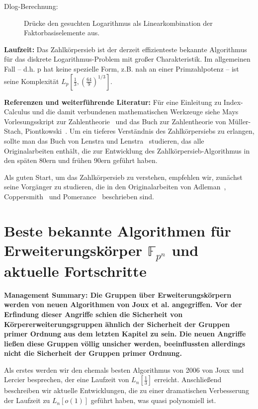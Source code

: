 \begin{refsegment}
\begin{description}
\item[Dlog-Berechnung:] Drücke den gesuchten Logarithmus als Linearkombination der Faktorbasiselemente aus.
\end{description}

\textbf{Laufzeit:}
Das Zahlkörpersieb ist der derzeit effizienteste bekannte Algorithmus für das diskrete Logarithmus-Problem mit großer Charakteristik. Im allgemeinen Fall -- d.h. p hat keine spezielle Form, z.B. nah an einer Primzahlpotenz -- ist seine Komplexität $L_p[\frac 1
3,\left(\frac{64}{9}\right)^{1/3}]$.

\textbf{Referenzen und weiterführende Literatur:}
Für eine Einleitung zu Index-Calculus und die damit verbundenen mathematischen Werkzeuge siehe Mays Vorlesungsskript zur Zahlentheorie~\cite{May2013} und das Buch zur Zahlentheorie von M\"uller-Stach, Piontkowski~\cite{MSP2011}. Um ein tieferes Verständnis des Zahlkörpersiebs zu erlangen, sollte man das Buch von Lenstra und Lenstra~\cite{NFS1993} studieren, das alle Originalarbeiten enthält, die zur Entwicklung des Zahlkörpersieb-Algorithmus in den späten 80ern und frühen 90ern geführt haben.

Als guten Start, um das Zahlkörpersieb zu verstehen, empfehlen wir, zunächst seine Vorgänger zu studieren, die in den Originalarbeiten von Adleman~\cite{Adleman1979}, Coppersmith~\cite{CoppersmithOS1986} und Pomerance~\cite{Pomerance1984,Pomerance1996} beschrieben sind.


\section{\texorpdfstring{Beste bekannte Algorithmen für Erweiterungskörper $\mathbb{F}_{p^n}$ und aktuelle Fortschritte}
                        {Beste bekannte Algorithmen für Erweiterungskörper Fpn und aktuelle Fortschritte}}
\label{ffs}
\textbf{Management Summary: Die Gruppen über Erweiterungskörpern werden von neuen Algorithmen von Joux et al. angegriffen. Vor der Erfindung dieser Angriffe schien die Sicherheit von Körpererweiterungsgruppen ähnlich der Sicherheit der Gruppen primer Ordnung aus dem letzten Kapitel zu sein. Die neuen Angriffe ließen diese Gruppen völlig unsicher werden, beeinflussten allerdings nicht die Sicherheit der Gruppen primer Ordnung.\\[0.1cm]}

Als erstes werden wir den ehemals besten Algorithmus von 2006 von Joux und Lercier besprechen, der eine Laufzeit von $L_n[\frac 1 3]$ erreicht. Anschließend beschreiben wir aktuelle Entwicklungen, die zu einer dramatischen Verbesserung der Laufzeit zu $L_n[o(1)]$ geführt haben, was quasi polynomiell ist.



\end{refsegment}

